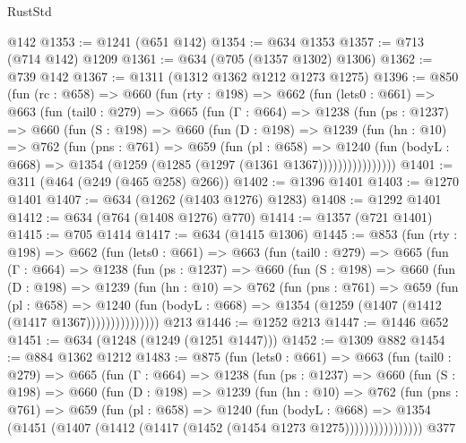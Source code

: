 \begin{lexlean}{RustStd}
\begin{coremodule}
    @142
@1353 := @1241 (@651 @142)
@1354 := @634 @1353
@1357 := @713 (@714 @142) @1209
@1361 := @634 (@705 (@1357 @1302) @1306)
@1362 := @739 @142
@1367 := @1311 (@1312 @1362 @1212 @1273 @1275)
@1396 := @850
    (fun (rc : @658) =>
    @660
      (fun (rty : @198) =>
      @662
        (fun (lets0 : @661) =>
        @663
          (fun (tail0 : @279) =>
          @665
            (fun (Γ : @664) =>
            @1238
              (fun (ps : @1237) =>
              @660
                (fun (S : @198) =>
                @660
                  (fun (D : @198) =>
                  @1239
                    (fun (hn : @10) =>
                    @762
                      (fun (pns : @761) =>
                      @659
                        (fun (pl : @658) =>
                        @1240
                          (fun (bodyL : @668) =>
                          @1354 (@1259 (@1285 (@1297 (@1361 @1367))))))))))))))))
@1401 := @311 (@464 (@249 (@465 @258) @266))
@1402 := @1396 @1401
@1403 := @1270 @1401
@1407 := @634 (@1262 (@1403 @1276) @1283)
@1408 := @1292 @1401
@1412 := @634 (@764 (@1408 @1276) @770)
@1414 := @1357 (@721 @1401)
@1415 := @705 @1414
@1417 := @634 (@1415 @1306)
@1445 := @853
    (fun (rty : @198) =>
    @662
      (fun (lets0 : @661) =>
      @663
        (fun (tail0 : @279) =>
        @665
          (fun (Γ : @664) =>
          @1238
            (fun (ps : @1237) =>
            @660
              (fun (S : @198) =>
              @660
                (fun (D : @198) =>
                @1239
                  (fun (hn : @10) =>
                  @762
                    (fun (pns : @761) =>
                    @659
                      (fun (pl : @658) =>
                      @1240
                        (fun (bodyL : @668) =>
                        @1354 (@1259 (@1407 (@1412 (@1417 @1367)))))))))))))))
    @213
@1446 := @1252 @213
@1447 := @1446 @652
@1451 := @634 (@1248 (@1249 (@1251 @1447)))
@1452 := @1309 @882
@1454 := @884 @1362 @1212
@1483 := @875
    (fun (lets0 : @661) =>
    @663
      (fun (tail0 : @279) =>
      @665
        (fun (Γ : @664) =>
        @1238
          (fun (ps : @1237) =>
          @660
            (fun (S : @198) =>
            @660
              (fun (D : @198) =>
              @1239
                (fun (hn : @10) =>
                @762
                  (fun (pns : @761) =>
                  @659
                    (fun (pl : @658) =>
                    @1240
                      (fun (bodyL : @668) =>
                      @1354 (@1451 (@1407 (@1412 (@1417 (@1452 (@1454 @1273 @1275))))))))))))))))
    @377

\end{coremodule}
\end{lexlean}
